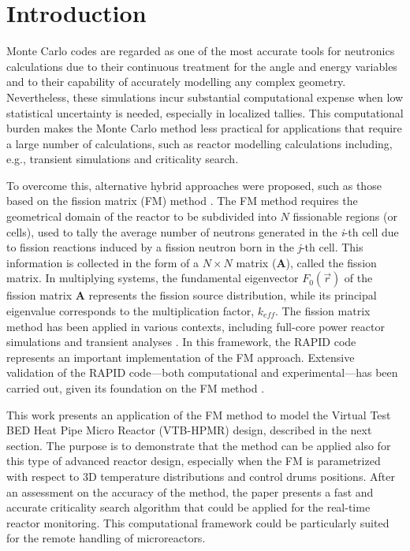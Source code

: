 \documentclass[preprint,review,12pt]{elsarticle}
\begin{document}
\section{Introduction} \label{section:Introduction}

Monte Carlo codes are regarded as one of the most accurate tools for neutronics calculations due to their continuous treatment for the angle and energy variables and to their capability of accurately modelling any complex geometry. Nevertheless, these simulations incur substantial computational expense when low statistical uncertainty is needed, especially in localized tallies. This computational burden makes the Monte Carlo method less practical for applications that require a large number of calculations, such as reactor modelling calculations including, e.g., transient simulations and criticality search.

To overcome this, alternative hybrid approaches were proposed, such as those based on the fission matrix (FM) method \cite{Carney2014}. The FM method requires the geometrical domain of the reactor to be subdivided into $N$ fissionable regions (or cells), used to tally the average number of neutrons generated in the \textit{i}-th cell due to fission reactions induced by a fission neutron born in the \textit{j}-th cell. This information is collected in the form of a $N \times N$ matrix ($\textbf{A}$), called the fission matrix. In multiplying systems, the fundamental eigenvector $F_0(\vec{r})$ of the fission matrix $\textbf{A}$ represents the fission source distribution, while its principal eigenvalue corresponds to the multiplication factor, $k_{eff}$.
The fission matrix method has been applied in various contexts, including full-core power reactor simulations \cite{Walters2018} and transient analyses \cite{Laureau2015}.
In this framework, the RAPID code represents an important implementation of the FM approach. Extensive validation of the RAPID code—both computational and experimental—has been carried out, given its foundation on the FM method \cite{RAU2020103273,Mascolino2022,Mascolino_trapid}.

This work presents an application of the FM method to model the Virtual Test BED Heat Pipe Micro Reactor (VTB-HPMR) design, described in the next section. The purpose is to demonstrate that the method can be applied also for this type of advanced reactor design, especially when the FM is parametrized with respect to 3D temperature distributions and control drums positions. After an assessment on the accuracy of the method, the paper presents a fast and accurate criticality search algorithm that could be applied for the real-time reactor monitoring. This computational framework could be particularly suited for the remote handling of microreactors.
\end{document}
